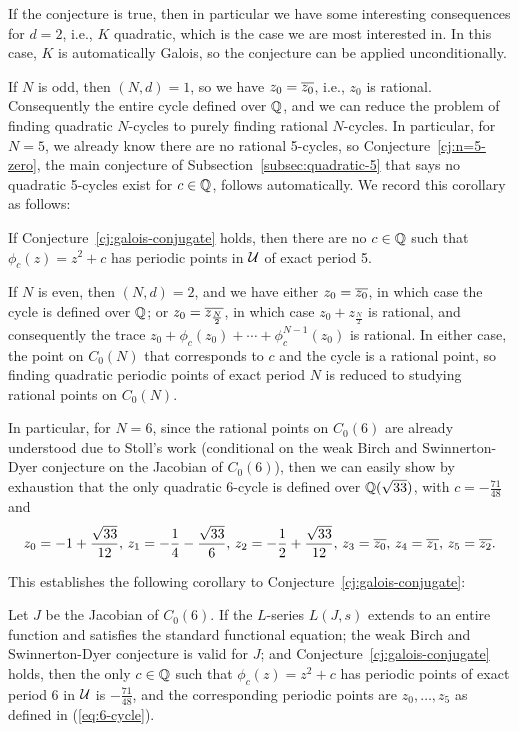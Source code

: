 If the conjecture is true, then in particular we have some interesting
consequences for $d = 2$, i.e., $K$ quadratic, which is the case we
are most interested in. In this case, $K$ is automatically Galois, so
the conjecture can be applied unconditionally.

If $N$ is odd, then $(N, d) = 1$, so we have $z_0 = \overline{z_0}$, i.e.,
$z_0$ is rational. Consequently the entire cycle defined over $\mathbb{Q}$,
and we can reduce the problem of finding quadratic $N$-cycles to
purely finding rational $N$-cycles. In particular, for $N = 5$, we
already know there are no rational 5-cycles, so
Conjecture~\ref{cj:n=5-zero}, the main conjecture of
Subsection~\ref{subsec:quadratic-5} that says no quadratic 5-cycles
exist for $c \in \mathbb{Q}$, follows automatically. We record this corollary
as follows:

\begin{corollary}
  If Conjecture~\ref{cj:galois-conjugate} holds, then there are no $c
  \in \mathbb{Q}$ such that $\phi_c(z) = z^2 + c$ has periodic points in $\mathcal{U}$
  of exact period 5.
\end{corollary}

If $N$ is even, then $(N, d) = 2$, and we have either $z_0 =
\overline{z_0}$, in which case the cycle is defined over $\mathbb{Q}$; or $z_0 =
\overline{z_{\frac{N}{2}}}$, in which case $z_0 + z_{\frac{N}{2}}$ is
rational, and consequently the trace $z_0 + \phi_c(z_0) + \cdots +
\phi_c^{N-1}(z_0)$ is rational. In either case, the point on $C_0(N)$
that corresponds to $c$ and the cycle is a rational point, so finding
quadratic periodic points of exact period $N$ is reduced to studying
rational points on $C_0(N)$.

In particular, for $N = 6$, since the rational points on $C_0(6)$ are
already understood due to Stoll's work \cite{MR2465796} (conditional
on the weak Birch and Swinnerton-Dyer conjecture on the Jacobian of
$C_0(6)$), then we can easily show by exhaustion that the only
quadratic 6-cycle is defined over $\mathbb{Q}(\sqrt{33})$, with $c =
-\frac{71}{48}$ and
\begin{equation}
  \label{eq:6-cycle}
  z_0 = -1 + \frac{\sqrt{33}}{12},\,
  z_1 = -\frac{1}{4} - \frac{\sqrt{33}}{6},\,
  z_2 = -\frac{1}{2} + \frac{\sqrt{33}}{12},\,
  z_3 = \overline{z_0},\,
  z_4 = \overline{z_1},\,
  z_5 = \overline{z_2}.
\end{equation}

This establishes the following corollary to
Conjecture~\ref{cj:galois-conjugate}:

\begin{corollary}
  \label{cor:6-cycle}
  Let $J$ be the Jacobian of $C_0(6)$. If the $L$-series $L(J, s)$
  extends to an entire function and satisfies the standard functional
  equation; the weak Birch and Swinnerton-Dyer conjecture is valid for
  $J$; and Conjecture~\ref{cj:galois-conjugate} holds, then the only
  $c \in \mathbb{Q}$ such that $\phi_c(z) = z^2 + c$ has periodic points of
  exact period 6 in $\mathcal{U}$ is $-\frac{71}{48}$, and the corresponding
  periodic points are $z_0, \dots, z_5$ as defined in
  (\ref{eq:6-cycle}).
\end{corollary}

